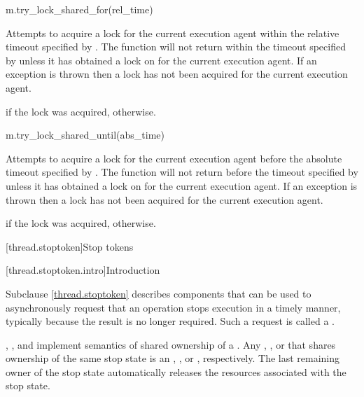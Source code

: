 \begin{itemdecl}
m.try_lock_shared_for(rel_time)
\end{itemdecl}

\begin{itemdescr}
\pnum
\effects
Attempts to acquire a lock for the current execution agent within
the relative timeout specified by .
The function will not return within the timeout specified by 
unless it has obtained a lock on  for the current execution agent.
If an exception is thrown then a lock has not been acquired for
the current execution agent.

\pnum
\returns
{} if the lock was acquired,  otherwise.
\end{itemdescr}

\begin{itemdecl}
m.try_lock_shared_until(abs_time)
\end{itemdecl}

\begin{itemdescr}
\pnum
\effects
Attempts to acquire a lock for the current execution agent before
the absolute timeout specified by .
The function will not return before the timeout specified by 
unless it has obtained a lock on  for the current execution agent.
If an exception is thrown then a lock has not been acquired for
the current execution agent.

\pnum
\returns
{} if the lock was acquired,  otherwise.
\end{itemdescr}

[thread.stoptoken]{Stop tokens}

[thread.stoptoken.intro]{Introduction}

\pnum
Subclause \ref{thread.stoptoken} describes components that can be used
to asynchronously request that an operation stops execution in a timely manner,
typically because the result is no longer required.
Such a request is called a .

\pnum
{}, , and 
implement semantics of shared ownership of a .
Any , , or 
that shares ownership of the same stop state is an 
, , or , respectively.
The last remaining owner of the stop state automatically
releases the resources associated with the stop state.

